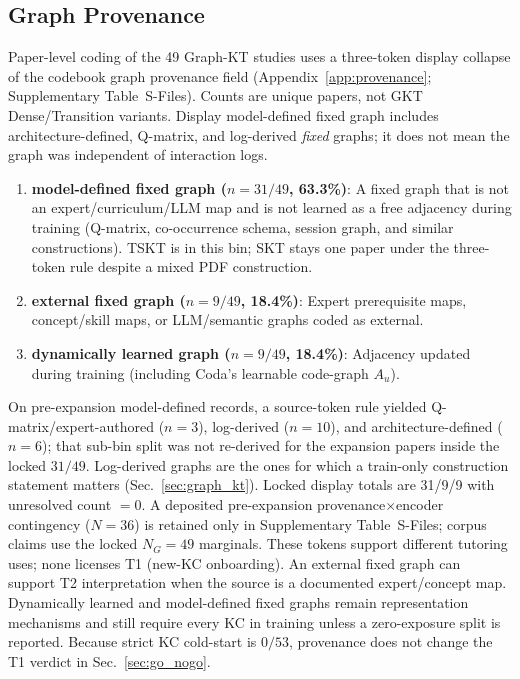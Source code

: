 \documentclass[lettersize,journal]{IEEEtran}
\begin{document}
\subsection{Graph Provenance}
\label{sec:graph_provenance}
Paper-level coding of the 49 Graph-KT studies uses a three-token display collapse of the codebook graph provenance field (Appendix~\ref{app:provenance}; Supplementary Table~S-Files). Counts are unique papers, not GKT Dense/Transition variants. Display model-defined fixed graph includes architecture-defined, Q-matrix, and log-derived \emph{fixed} graphs; it does not mean the graph was independent of interaction logs.
\begin{enumerate}
    \item \textbf{model-defined fixed graph ($n=31/49$, 63.3\%)}: A fixed graph that is not an expert/curriculum/LLM map and is not learned as a free adjacency during training (Q-matrix, co-occurrence schema, session graph, and similar constructions). TSKT is in this bin; SKT stays one paper under the three-token rule despite a mixed PDF construction.
    \item \textbf{external fixed graph ($n=9/49$, 18.4\%)}: Expert prerequisite maps, concept/skill maps, or LLM/semantic graphs coded as external.
    \item \textbf{dynamically learned graph ($n=9/49$, 18.4\%)}: Adjacency updated during training (including Coda's learnable code-graph \(A_u\)).
\end{enumerate}
On pre-expansion model-defined records, a source-token rule yielded Q-matrix/expert-authored ($n=3$), log-derived ($n=10$), and architecture-defined ($n=6$); that sub-bin split was not re-derived for the expansion papers inside the locked $31/49$. Log-derived graphs are the ones for which a train-only construction statement matters (Sec.~\ref{sec:graph_kt}). Locked display totals are 31/9/9 with unresolved count $=0$. A deposited pre-expansion provenance$\times$encoder contingency ($N=36$) is retained only in Supplementary Table~S-Files; corpus claims use the locked $N_G=49$ marginals.
These tokens support different tutoring uses; none licenses T1 (new-KC onboarding). An external fixed graph can support T2 interpretation when the source is a documented expert/concept map. Dynamically learned and model-defined fixed graphs remain representation mechanisms and still require every KC in training unless a zero-exposure split is reported. Because strict KC cold-start is $0/53$, provenance does not change the T1 verdict in Sec.~\ref{sec:go_nogo}.
\end{document}
